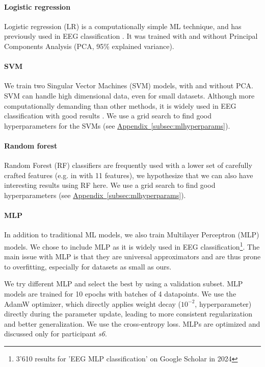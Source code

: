 \documentclass[10pt,conference,compsocconf]{IEEEtran}
\newcommand{\aref}[1]{\hyperref[#1]{Appendix~\ref*{#1}}}
\begin{document}
\paragraph{Logistic regression}
Logistic regression (LR) is a computationally simple ML technique, and has previously used in EEG classification \cite{SUBASI200587, NIPS2006_35937e34}. It was trained with and without Principal Components Analysis (PCA, 95\% explained variance).

\paragraph{SVM}
We train two Singular Vector Machines (SVM) models, with and without PCA. SVM can handle high dimensional data, even for small datasets. Although more computationally demanding than other methods, it is widely used in EEG classification with good results \cite{knn_svm_review}. We use a grid search to find good hyperparameters for the SVMs (see \aref{subsec:mlhyperparams}).

\paragraph{Random forest}
Random Forest (RF) classifiers are frequently used with a lower set of carefully crafted features (e.g. in \cite{eegrfclassif} with 11 features), we hypothesize that we can also have interesting results using RF here. We use a grid search to find good hyperparameters (see \aref{subsec:mlhyperparams}).

\paragraph{MLP}
In addition to traditional ML models, we also train Multilayer Perceptron (MLP) models. We chose to include MLP as it is widely used in EEG classification\footnote{3'610 results for 'EEG MLP classification' on Google Scholar in 2024}. The main issue with MLP is that they are universal approximators and are thus prone to overfitting, especially for datasets as small as ours.

We try different MLP and select the best by using a validation subset. MLP models are trained for 10 epochs with batches of 4 datapoints. We use the AdamW optimizer, which directly applies weight decay (\(10^{-2}\), hyperparameter) directly during the parameter update, leading to more consistent regularization and better generalization. We use the cross-entropy loss. MLPs are optimized and discussed only for participant \textit{s6}.
\end{document}

